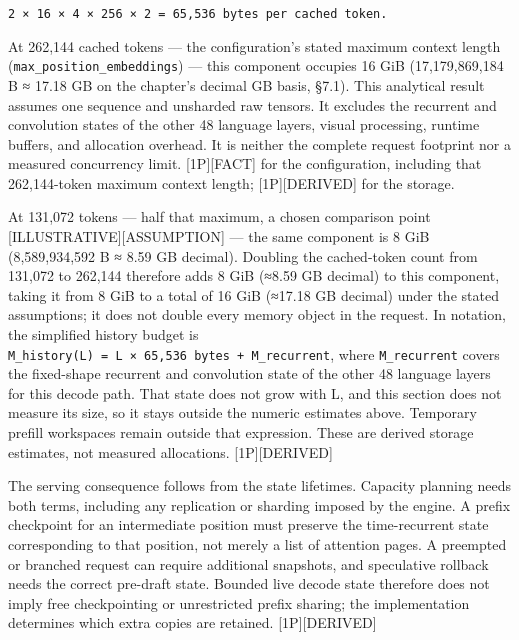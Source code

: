 \texttt{2\ ×\ 16\ ×\ 4\ ×\ 256\ ×\ 2\ =\ 65,536\ bytes\ per\ cached\ token.}

At 262,144 cached tokens --- the configuration's stated maximum context
length (\texttt{max\_position\_embeddings}) --- this component occupies
16 GiB (17,179,869,184 B ≈ 17.18 GB on the chapter's decimal GB basis,
§7.1). This analytical result assumes one sequence and unsharded raw
tensors. It excludes the recurrent and convolution states of the other
48 language layers, visual processing, runtime buffers, and allocation
overhead. It is neither the complete request footprint nor a measured
concurrency limit. \mbox{{[}1P{]}}\hspace{0pt}\mbox{{[}FACT{]}} for the configuration, including
that 262,144-token maximum context length; \mbox{{[}1P{]}}\hspace{0pt}\mbox{{[}DERIVED{]}} for the
storage.

At 131,072 tokens --- half that maximum, a chosen comparison point
\mbox{{[}ILLUSTRATIVE{]}}\hspace{0pt}\mbox{{[}ASSUMPTION{]}} --- the same component is 8 GiB
(8,589,934,592 B ≈ 8.59 GB decimal). Doubling the cached-token count
from 131,072 to 262,144 therefore adds 8 GiB (≈8.59 GB decimal) to this
component, taking it from 8 GiB to a total of 16 GiB (≈17.18 GB decimal)
under the stated assumptions; it does not double every memory object in
the request. In notation, the simplified history budget is
\texttt{M\_history(L)\ =\ L\ ×\ 65,536\ bytes\ +\ M\_recurrent}, where
\texttt{M\_recurrent} covers the fixed-shape recurrent and convolution
state of the other 48 language layers for this decode path. That state
does not grow with L, and this section does not measure its size, so it
stays outside the numeric estimates above. Temporary prefill workspaces
remain outside that expression. These are derived storage estimates, not
measured allocations. \mbox{{[}1P{]}}\hspace{0pt}\mbox{{[}DERIVED{]}}

The serving consequence follows from the state lifetimes. Capacity
planning needs both terms, including any replication or sharding imposed
by the engine. A prefix checkpoint for an intermediate position must
preserve the time-recurrent state corresponding to that position, not
merely a list of attention pages. A preempted or branched request can
require additional snapshots, and speculative rollback needs the correct
pre-draft state. Bounded live decode state therefore does not imply free
checkpointing or unrestricted prefix sharing; the implementation
determines which extra copies are retained. \mbox{{[}1P{]}}\hspace{0pt}\mbox{{[}DERIVED{]}}

